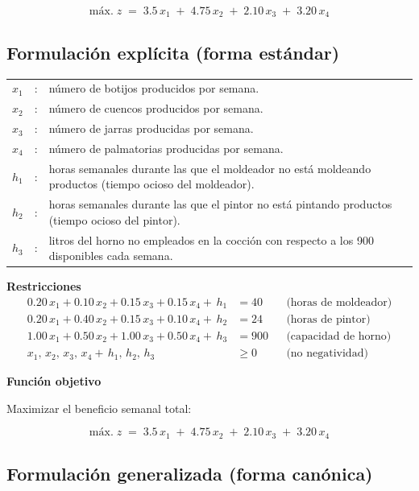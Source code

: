 \begin{equation}   
\mbox{máx.}\; z \;=\; 3.5\,x_1 \;+\; 4.75\,x_2 \;+\; 2.10\,x_3 \;+\; 3.20\,x_4
\end{equation}


\subsection{Formulación explícita (forma estándar)}

\begin{tabularx}{\textwidth}{l c X}
    $x_1$ & : & número de botijos producidos por semana. \\
    $x_2$ & : & número de cuencos producidos por semana. \\
    $x_3$ & : & número de jarras producidas por semana. \\
    $x_4$ & : & número de palmatorias producidas por semana. \\
    $h_1$ & : & horas semanales durante las que el moldeador no está moldeando productos (tiempo ocioso del moldeador). \\
    $h_2$ & : & horas semanales durante las que el pintor no está pintando productos (tiempo ocioso del pintor). \\
    $h_3$ & : & litros del horno no empleados en la cocción con respecto a los 900 disponibles cada semana. \\
\end{tabularx}

\textbf{Restricciones}
\begin{align}
0.20\,x_1 + 0.10\,x_2 + 0.15\,x_3 + 0.15\,x_4 +\,h_1 & = 40 
&& \text{(horas de moldeador)} \\[0.5em]
0.20\,x_1 + 0.40\,x_2 + 0.15\,x_3 + 0.10\,x_4  +\,h_2 & = 24 
&& \text{(horas de pintor)} \\[0.5em]
1.00\,x_1 + 0.50\,x_2 + 1.00\,x_3 + 0.50\,x_4  +\,h_3 & = 900 
&& \text{(capacidad de horno)} \\[0.5em]
x_1,\,x_2,\,x_3,\,x_4 +\,h_1,\,h_2,\,h_3 & \geq 0 
&& \text{(no negatividad)}
\end{align}


\textbf{Función objetivo}

Maximizar el beneficio semanal total:

\begin{equation}   
\mbox{máx.}\; z \;=\; 3.5\,x_1 \;+\; 4.75\,x_2 \;+\; 2.10\,x_3 \;+\; 3.20\,x_4
\end{equation}

\subsection{Formulación generalizada (forma canónica)}


